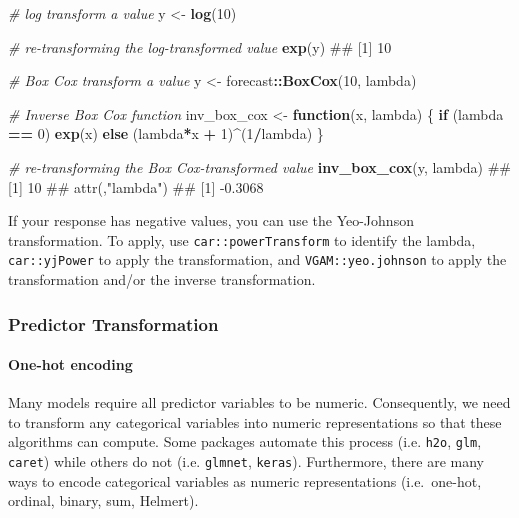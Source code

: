 \documentclass[]{book}
\newenvironment{Shaded}{\begin{snugshade}}{\end{snugshade}}
\newcommand{\CommentTok}[1]{\textcolor[rgb]{0.56,0.35,0.01}{\textit{#1}}}
\newcommand{\ControlFlowTok}[1]{\textcolor[rgb]{0.13,0.29,0.53}{\textbf{#1}}}
\newcommand{\DecValTok}[1]{\textcolor[rgb]{0.00,0.00,0.81}{#1}}
\newcommand{\KeywordTok}[1]{\textcolor[rgb]{0.13,0.29,0.53}{\textbf{#1}}}
\newcommand{\NormalTok}[1]{#1}
\newcommand{\OperatorTok}[1]{\textcolor[rgb]{0.81,0.36,0.00}{\textbf{#1}}}
\newcommand{\StringTok}[1]{\textcolor[rgb]{0.31,0.60,0.02}{#1}}
\let\oldparagraph\paragraph
\renewcommand{\paragraph}[1]{\oldparagraph{#1}\mbox{}}
\theoremstyle{definition}
\theoremstyle{definition}
\theoremstyle{definition}
\theoremstyle{remark}
\begin{document}
\begin{Shaded}
\begin{Highlighting}[]
\CommentTok{# log transform a value}
\NormalTok{y <-}\StringTok{ }\KeywordTok{log}\NormalTok{(}\DecValTok{10}\NormalTok{)}

\CommentTok{# re-transforming the log-transformed value}
\KeywordTok{exp}\NormalTok{(y)}
\NormalTok{## [1] 10}

\CommentTok{# Box Cox transform a value}
\NormalTok{y <-}\StringTok{ }\NormalTok{forecast}\OperatorTok{::}\KeywordTok{BoxCox}\NormalTok{(}\DecValTok{10}\NormalTok{, lambda)}

\CommentTok{# Inverse Box Cox function}
\NormalTok{inv_box_cox <-}\StringTok{ }\ControlFlowTok{function}\NormalTok{(x, lambda) \{}
  \ControlFlowTok{if}\NormalTok{ (lambda }\OperatorTok{==}\StringTok{ }\DecValTok{0}\NormalTok{) }\KeywordTok{exp}\NormalTok{(x) }\ControlFlowTok{else}\NormalTok{ (lambda}\OperatorTok{*}\NormalTok{x }\OperatorTok{+}\StringTok{ }\DecValTok{1}\NormalTok{)}\OperatorTok{^}\NormalTok{(}\DecValTok{1}\OperatorTok{/}\NormalTok{lambda) }
\NormalTok{\}}

\CommentTok{# re-transforming the Box Cox-transformed value}
\KeywordTok{inv_box_cox}\NormalTok{(y, lambda)}
\NormalTok{## [1] 10}
\NormalTok{## attr(,"lambda")}
\NormalTok{## [1] -0.3068}
\end{Highlighting}
\end{Shaded}

\begin{tip}
If your response has negative values, you can use the Yeo-Johnson
transformation. To apply, use \texttt{car::powerTransform} to identify
the lambda, \texttt{car::yjPower} to apply the transformation, and
\texttt{VGAM::yeo.johnson} to apply the transformation and/or the
inverse transformation.
\end{tip}

\hypertarget{predictor-transformation}{%
\subsubsection{Predictor
Transformation}\label{predictor-transformation}}

\hypertarget{one-hot-encoding}{%
\paragraph{One-hot encoding}\label{one-hot-encoding}}

Many models require all predictor variables to be numeric. Consequently,
we need to transform any categorical variables into numeric
representations so that these algorithms can compute. Some packages
automate this process (i.e. \texttt{h2o}, \texttt{glm}, \texttt{caret})
while others do not (i.e. \texttt{glmnet}, \texttt{keras}). Furthermore,
there are many ways to encode categorical variables as numeric
representations (i.e.~one-hot, ordinal, binary, sum, Helmert).
\end{document}
